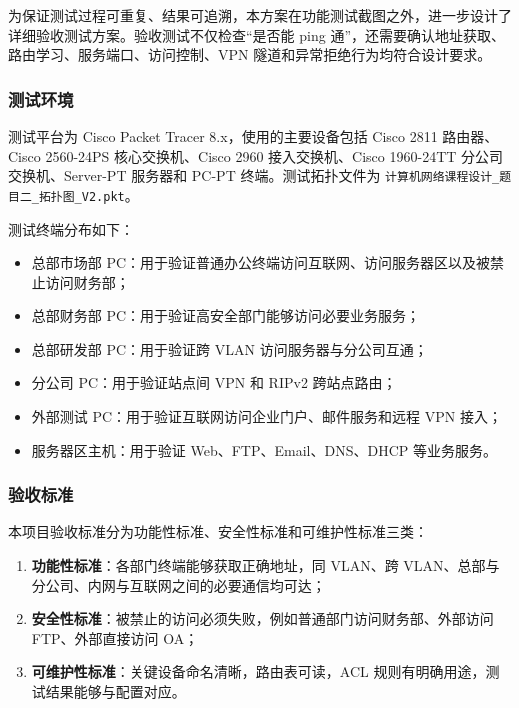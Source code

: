 \documentclass[12pt,a4paper]{ctexart}
\begin{document}
为保证测试过程可重复、结果可追溯，本方案在功能测试截图之外，进一步设计了详细验收测试方案。验收测试不仅检查“是否能 ping 通”，还需要确认地址获取、路由学习、服务端口、访问控制、VPN 隧道和异常拒绝行为均符合设计要求。

\subsubsection{测试环境}

测试平台为 Cisco Packet Tracer 8.x，使用的主要设备包括 Cisco 2811 路由器、Cisco 2560-24PS 核心交换机、Cisco 2960 接入交换机、Cisco 1960-24TT 分公司交换机、Server-PT 服务器和 PC-PT 终端。测试拓扑文件为 \texttt{计算机网络课程设计\_题目二\_拓扑图\_V2.pkt}。

测试终端分布如下：

\begin{itemize}
    \item 总部市场部 PC：用于验证普通办公终端访问互联网、访问服务器区以及被禁止访问财务部；
    \item 总部财务部 PC：用于验证高安全部门能够访问必要业务服务；
    \item 总部研发部 PC：用于验证跨 VLAN 访问服务器与分公司互通；
    \item 分公司 PC：用于验证站点间 VPN 和 RIPv2 跨站点路由；
    \item 外部测试 PC：用于验证互联网访问企业门户、邮件服务和远程 VPN 接入；
    \item 服务器区主机：用于验证 Web、FTP、Email、DNS、DHCP 等业务服务。
\end{itemize}

\subsubsection{验收标准}

本项目验收标准分为功能性标准、安全性标准和可维护性标准三类：

\begin{enumerate}[label=(\arabic*), leftmargin=2em]
    \item \textbf{功能性标准}：各部门终端能够获取正确地址，同 VLAN、跨 VLAN、总部与分公司、内网与互联网之间的必要通信均可达；
    \item \textbf{安全性标准}：被禁止的访问必须失败，例如普通部门访问财务部、外部访问 FTP、外部直接访问 OA；
    \item \textbf{可维护性标准}：关键设备命名清晰，路由表可读，ACL 规则有明确用途，测试结果能够与配置对应。
\end{enumerate}
\end{document}

